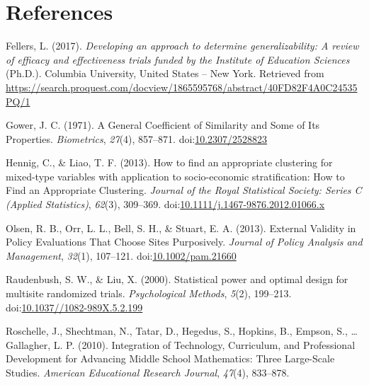 \documentclass[man,floatsintext]{apa6}
\theoremstyle{definition}
\theoremstyle{definition}
\theoremstyle{definition}
\theoremstyle{remark}
\begin{document}
\newpage

\hypertarget{references}{%
\section{References}\label{references}}

\begingroup
\setlength{\parindent}{-0.5in}
\setlength{\leftskip}{0.5in}

\hypertarget{refs}{}
\leavevmode\hypertarget{ref-fellersDevelopingApproachDetermine2017}{}%
Fellers, L. (2017). \emph{Developing an approach to determine
generalizability: A review of efficacy and effectiveness trials funded
by the Institute of Education Sciences} (Ph.D.). Columbia University,
United States -- New York. Retrieved from
\url{https://search.proquest.com/docview/1865595768/abstract/40FD82F4A0C24535PQ/1}

\leavevmode\hypertarget{ref-gowerGeneralCoefficientSimilarity1971}{}%
Gower, J. C. (1971). A General Coefficient of Similarity and Some of Its
Properties. \emph{Biometrics}, \emph{27}(4), 857--871.
doi:\href{https://doi.org/10.2307/2528823}{10.2307/2528823}

\leavevmode\hypertarget{ref-hennigHowFindAppropriate2013}{}%
Hennig, C., \& Liao, T. F. (2013). How to find an appropriate clustering
for mixed-type variables with application to socio-economic
stratification: How to Find an Appropriate Clustering. \emph{Journal of
the Royal Statistical Society: Series C (Applied Statistics)},
\emph{62}(3), 309--369.
doi:\href{https://doi.org/10.1111/j.1467-9876.2012.01066.x}{10.1111/j.1467-9876.2012.01066.x}

\leavevmode\hypertarget{ref-olsenExternalValidityPolicy2013}{}%
Olsen, R. B., Orr, L. L., Bell, S. H., \& Stuart, E. A. (2013). External
Validity in Policy Evaluations That Choose Sites Purposively.
\emph{Journal of Policy Analysis and Management}, \emph{32}(1),
107--121.
doi:\href{https://doi.org/10.1002/pam.21660}{10.1002/pam.21660}

\leavevmode\hypertarget{ref-raudenbushStatisticalPowerOptimal2000}{}%
Raudenbush, S. W., \& Liu, X. (2000). Statistical power and optimal
design for multisite randomized trials. \emph{Psychological Methods},
\emph{5}(2), 199--213.
doi:\href{https://doi.org/10.1037//1082-989X.5.2.199}{10.1037//1082-989X.5.2.199}

\leavevmode\hypertarget{ref-roschelleIntegrationTechnologyCurriculum2010}{}%
Roschelle, J., Shechtman, N., Tatar, D., Hegedus, S., Hopkins, B.,
Empson, S., \ldots{} Gallagher, L. P. (2010). Integration of Technology,
Curriculum, and Professional Development for Advancing Middle School
Mathematics: Three Large-Scale Studies. \emph{American Educational
Research Journal}, \emph{47}(4), 833--878.
\end{document}
